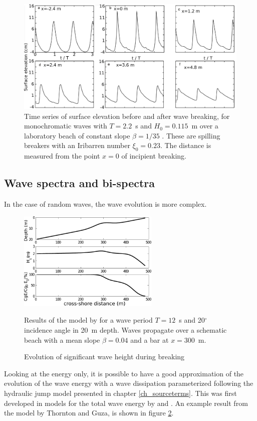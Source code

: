 \begin{figure}
\centerline{\includegraphics[width=\textwidth]{FIGS_CH_SURF/f_surf_formeCox.pdf}}
 \caption{Time series of surface elevation before and after wave breaking, for monochromatic waves with $T=2.2$~s and $H_0 =0.115$~m over a laboratory beach of 
 constant slope $\beta=1/35$ \citep[taken from][]{Cox1995}. These are spilling breakers with an Iribarren number $\xi_0 = 0.23$.  
 The distance is measured from the point $x=0$ of incipient breaking. \label{f_surf_formeCox}}
\end{figure}


\subsection{Wave spectra and bi-spectra}
In the case of random waves, the wave evolution is more complex. 
\begin{figure}[htb]
\centerline{\includegraphics[width=0.6\textwidth]{FIGS_CH_SURF/surfer_en.pdf}}
  \caption{Evolution of significant wave height during breaking}
    {Results of the model by \cite{Thornton&Guza1986}  for a wave period $T=12$~s and 20$^\circ$ incidence angle 
    in 20~m depth. Waves propagate over a schematic beach with a mean slope $\beta=0.04$ 
    and a bar at $x=300$~m.}
\label{fig:surfer}
\end{figure}
Looking at the energy only, it is possible to have a good approximation of the 
evolution of the wave energy with a wave dissipation parameterized following the hydraulic jump model presented in chapter \ref{ch_sourceterms}. This was first 
developed in models for the total wave energy by \cite{Battjes&Janssen1978} and \cite{Thornton&Guza1983}. 
An example result from the model by Thornton and Guza, is shown in figure \ref{fig:surfer}. 

